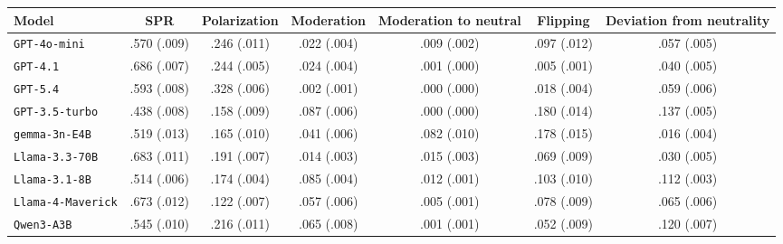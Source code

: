 \begin{tabular}{lcccccc}
		\\
		\hline
		Model & SPR & Polarization & Moderation & Moderation to neutral & Flipping & Deviation from neutrality \\
		\hline
		\texttt{GPT-4o-mini} & .570 (.009) & .246 (.011) & .022 (.004) & .009 (.002) & .097 (.012) & .057 (.005) \\
		\texttt{GPT-4.1} & .686 (.007) & .244 (.005) & .024 (.004) & .001 (.000) & .005 (.001) & .040 (.005) \\
		\texttt{GPT-5.4} & .593 (.008) & .328 (.006) & .002 (.001) & .000 (.000) & .018 (.004) & .059 (.006) \\
		\texttt{GPT-3.5-turbo} & .438 (.008) & .158 (.009) & .087 (.006) & .000 (.000) & .180 (.014) & .137 (.005) \\
		\texttt{gemma-3n-E4B} & .519 (.013) & .165 (.010) & .041 (.006) & .082 (.010) & .178 (.015) & .016 (.004) \\
		\texttt{Llama-3.3-70B} & .683 (.011) & .191 (.007) & .014 (.003) & .015 (.003) & .069 (.009) & .030 (.005) \\
		\texttt{Llama-3.1-8B} & .514 (.006) & .174 (.004) & .085 (.004) & .012 (.001) & .103 (.010) & .112 (.003) \\
		\texttt{Llama-4-Maverick} & .673 (.012) & .122 (.007) & .057 (.006) & .005 (.001) & .078 (.009) & .065 (.006) \\
		\texttt{Qwen3-A3B} & .545 (.010) & .216 (.011) & .065 (.008) & .001 (.001) & .052 (.009) & .120 (.007) \\
		\hline
\end{tabular}
